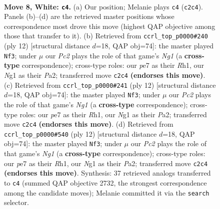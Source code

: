 \documentclass[11pt]{article}
\begin{document}
\begin{figure}[p]\centering
\begin{subfigure}{0.46\textwidth}\centering
\resizebox{\linewidth}{!}{%
\newchessgame
\chessboard[
  setfen={rn1qkbnr/pp2p1p1/2p3bp/5p2/3P3P/6NR/PPP2PP1/R1BQKBN1 w Qkq - 0 8},
  showmover=false,
  pgfstyle=straightmove, color=movearrow, markmove={c2-c4}
]}
\caption{}
\end{subfigure}\hfill
\begin{subfigure}{0.46\textwidth}\centering
\resizebox{\linewidth}{!}{%
\newchessgame
\chessboard[
  setfen={rn1qkbnr/pp2ppp1/2p3bp/8/3P3P/6N1/PPP2PP1/R1BQKBNR w KQkq - 0 7},
  showmover=false,
  pgfstyle=straightmove, color=movearrow, markmove={g1-f3}
]}
\caption{}
\end{subfigure}
\\[4pt]
\begin{subfigure}{0.46\textwidth}\centering
\resizebox{\linewidth}{!}{%
\newchessgame
\chessboard[
  setfen={rn1qkbnr/pp2ppp1/2p3bp/8/3P3P/6N1/PPP2PP1/R1BQKBNR w KQkq - 0 7},
  showmover=false,
  pgfstyle=straightmove, color=movearrow, markmove={g1-f3}
]}
\caption{}
\end{subfigure}\hfill
\begin{subfigure}{0.46\textwidth}\centering
\resizebox{\linewidth}{!}{%
\newchessgame
\chessboard[
  setfen={rn1qkbnr/pp2ppp1/2p3bp/8/3P3P/6N1/PPP2PP1/R1BQKBNR w KQkq - 0 7},
  showmover=false,
  pgfstyle=straightmove, color=movearrow, markmove={g1-f3}
]}
\caption{}
\end{subfigure}
\caption{\textbf{Move 8, White: \texttt{c4}.} (a) Our position; Melanie plays \texttt{c4} (\texttt{c2c4}). Panels (b)--(d) are the retrieved master positions whose correspondence most drove this move (highest QAP objective among those that transfer to it). (b) Retrieved from \texttt{ccrl\_top\_p0000\#240} (ply 12) [structural distance $d$=18, QAP obj=74]: the master played \texttt{Nf3}; under $\mu$ our \emph{Pc2} plays the role of that game's \emph{Ng1} (a \textbf{cross-type} correspondence); cross-type roles: our \emph{p}e7 as their \emph{R}h1, our \emph{N}g1 as their \emph{P}a2; transferred move \texttt{c2c4} \textbf{(endorses this move)}. (c) Retrieved from \texttt{ccrl\_top\_p0000\#241} (ply 12) [structural distance $d$=18, QAP obj=74]: the master played \texttt{Nf3}; under $\mu$ our \emph{Pc2} plays the role of that game's \emph{Ng1} (a \textbf{cross-type} correspondence); cross-type roles: our \emph{p}e7 as their \emph{R}h1, our \emph{N}g1 as their \emph{P}a2; transferred move \texttt{c2c4} \textbf{(endorses this move)}. (d) Retrieved from \texttt{ccrl\_top\_p0000\#540} (ply 12) [structural distance $d$=18, QAP obj=74]: the master played \texttt{Nf3}; under $\mu$ our \emph{Pc2} plays the role of that game's \emph{Ng1} (a \textbf{cross-type} correspondence); cross-type roles: our \emph{p}e7 as their \emph{R}h1, our \emph{N}g1 as their \emph{P}a2; transferred move \texttt{c2c4} \textbf{(endorses this move)}. Synthesis: 37 retrieved analogs transferred to \texttt{c4} (summed QAP objective 2732, the strongest correspondence among the candidate moves); Melanie committed it via the \texttt{search} selector.}
\label{fig:thought-m14}
\end{figure}
\end{document}
